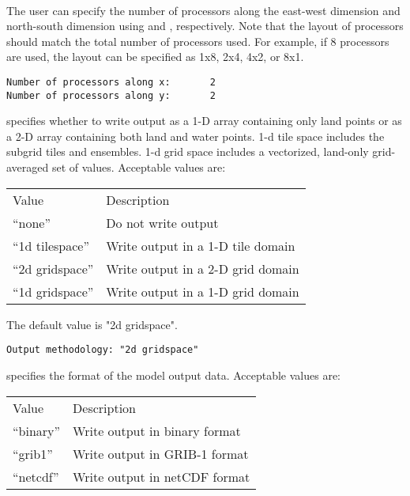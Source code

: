  \\

 The user can specify the number of
 processors along the east-west dimension and north-south dimension
 using  and 
 , respectively. Note that the layout 
 of processors should match the total number of processors used. For example, 
 if 8 processors are used, the layout can be specified as 1x8, 2x4, 4x2,
 or 8x1.
 

 \begin{Verbatim}[frame=single]
Number of processors along x:       2
Number of processors along y:       2
 \end{Verbatim}

 
  specifies whether to write output as a
 1-D array containing only land points or as a 2-D array containing
 both land and water points. 1-d tile space includes the subgrid
 tiles and ensembles. 1-d grid space includes a vectorized, land-only
 grid-averaged set of values.
 Acceptable values are:

 \begin{tabular}{ll}
 Value          & Description                         \\
 ``none''         & Do not write output               \\
 ``1d tilespace'' & Write output in a 1-D tile domain \\
 ``2d gridspace'' & Write output in a 2-D grid domain \\
 ``1d gridspace'' & Write output in a 1-D grid domain \\
 \end{tabular}

 The default value is "2d gridspace".
 

 \begin{Verbatim}[frame=single]
Output methodology: "2d gridspace"
 \end{Verbatim}

 
  specifies the format of the model output data.
 Acceptable values are:

 \begin{tabular}{ll}
 Value      & Description                       \\
 ``binary'' & Write output in binary format     \\
 ``grib1''  & Write output in GRIB-1 format     \\
 ``netcdf'' & Write output in netCDF format     \\
 \end{tabular}

